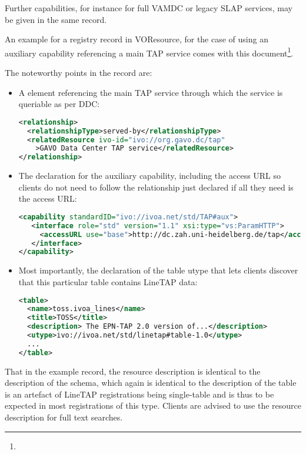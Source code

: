 \documentclass[11pt,a4paper]{ivoa}
\begin{document}
Further capabilities, for instance for full VAMDC or legacy SLAP
services, may be given in the same record.

An example for a registry record in VOResource, for the case of
using an auxiliary capability referencing a main TAP service comes with
this document\footnote{}.

The noteworthy points in the record are:

\begin{itemize}
\item A  element referencing the main TAP service
through which the service is queriable as per DDC:
\begin{lstlisting}[language=XML,basicstyle=\footnotesize]
<relationship>
  <relationshipType>served-by</relationshipType>
  <relatedResource ivo-id="ivo://org.gavo.dc/tap"
    >GAVO Data Center TAP service</relatedResource>
</relationship>
\end{lstlisting}

\item The declaration for the auxiliary capability, including the access
URL so clients do not need to follow the relationship just declared if
all they need is the access URL:
\begin{lstlisting}[language=XML,basicstyle=\footnotesize]
<capability standardID="ivo://ivoa.net/std/TAP#aux">
   <interface role="std" version="1.1" xsi:type="vs:ParamHTTP">
     <accessURL use="base">http://dc.zah.uni-heidelberg.de/tap</accessURL>
   </interface>
</capability>
\end{lstlisting}

\item Most importantly, the declaration of the table utype that lets
clients discover that this particular table contains LineTAP data:
\begin{lstlisting}[language=XML,basicstyle=\footnotesize]
<table>
  <name>toss.ivoa_lines</name>
  <title>TOSS</title>
  <description> The EPN-TAP 2.0 version of...</description>
  <utype>ivo://ivoa.net/std/linetap#table-1.0</utype>
  ...
</table>
\end{lstlisting}
\end{itemize}

That in the example record, the resource description is identical to the
description of the schema, which again is identical to the description
of the table is an artefact of LineTAP registrations being single-table
and is thus to be expected in most registrations of this type.  Clients
are advised to use the resource description for full text searches.
\end{document}
